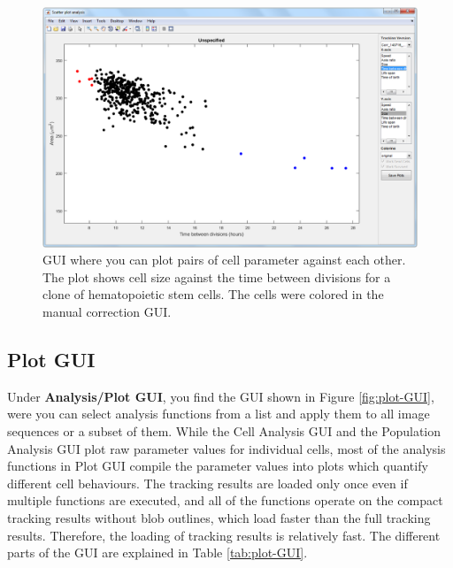 \documentclass[a4paper, oneside, onecolumn, 11pt]{article}
\newcommand{\menu}[1]{\textbf{#1}}
\begin{document}
\begin{figure}[!htb]
\begin{center}
\includegraphics[width = \columnwidth]{figures/scatterPlotGUI}
\caption{GUI where you can plot pairs of cell parameter against each other. The plot shows cell size against the time between divisions for a clone of hematopoietic stem cells. The cells were colored in the manual correction GUI.}
\label{fig:scatter-plot-GUI}
\end{center}
\end{figure}

\subsection{Plot GUI}
Under \menu{Analysis/\allowbreak Plot GUI}, you find the GUI shown in Figure \ref{fig:plot-GUI}, were you can select analysis functions from a list and apply them to all image sequences or a subset of them. While the Cell Analysis GUI and the Population Analysis GUI plot raw parameter values for individual cells, most of the analysis functions in Plot GUI compile the parameter values into plots which quantify different cell behaviours. The tracking results are loaded only once even if multiple functions are executed, and all of the functions operate on the compact tracking results without blob outlines, which load faster than the full tracking results. Therefore, the loading of tracking results is relatively fast. The different parts of the GUI are explained in Table \ref{tab:plot-GUI}.
\end{document}
